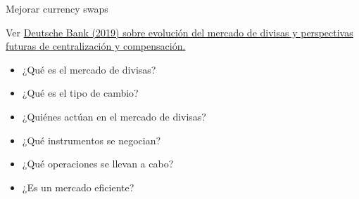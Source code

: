 \documentclass{nuevotema}
\begin{document}
\ideaclave

Mejorar currency swaps

Ver \href{https://www.dbresearch.com/servlet/reweb2.ReWEB?rwsite=RPS_EN-PROD&rwobj=ReDisplay.Start.class&document=PROD0000000000502442}{Deutsche Bank (2019) sobre evolución del mercado de divisas y perspectivas futuras de centralización y compensación.}


\begin{itemize}
	\item ¿Qué es el mercado de divisas?
	\item ¿Qué es el tipo de cambio?
	\item ¿Quiénes actúan en el mercado de divisas?
	\item ¿Qué instrumentos se negocian?
	\item ¿Qué operaciones se llevan a cabo?
	\item ¿Es un mercado eficiente?
\end{itemize}

\esquemacorto
\end{document}
